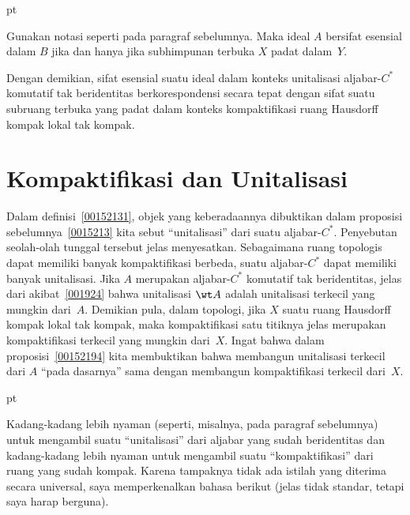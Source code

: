  pt

\begin{prop}\label{0038474} Gunakan notasi seperti pada paragraf sebelumnya. Maka
ideal $A$ bersifat esensial dalam $B$ jika dan hanya jika subhimpunan terbuka $X$ padat dalam~$Y$.
\end{prop}

Dengan demikian, sifat esensial suatu ideal dalam konteks unitalisasi aljabar-$C^*$
komutatif tak beridentitas berkorespondensi secara tepat dengan sifat suatu subruang terbuka
yang padat dalam konteks kompaktifikasi ruang Hausdorff kompak lokal
tak kompak.





















\section{Kompaktifikasi dan Unitalisasi}
Dalam definisi~\ref{00152131}, objek yang keberadaannya dibuktikan dalam
proposisi sebelumnya~\ref{0015213} kita sebut ``unitalisasi'' dari suatu aljabar-$C^*$. Penyebutan seolah-olah tunggal
tersebut jelas menyesatkan. Sebagaimana ruang topologis dapat memiliki banyak
kompaktifikasi berbeda, suatu aljabar-$C^*$ dapat memiliki banyak unitalisasi. Jika $A$ merupakan
aljabar-$C^*$ komutatif tak beridentitas, jelas dari akibat~\ref{001924} bahwa
unitalisasi $\wt A$ adalah unitalisasi terkecil yang mungkin dari~$A$. Demikian pula, dalam topologi,
jika $X$ suatu ruang Hausdorff kompak lokal tak kompak, maka kompaktifikasi
satu titiknya jelas merupakan kompaktifikasi terkecil yang mungkin dari~$X$. Ingat bahwa
dalam proposisi~\ref{00152194} kita membuktikan bahwa membangun unitalisasi terkecil
dari $A$ ``pada dasarnya'' sama dengan membangun kompaktifikasi terkecil
dari~$X$.

  pt

Kadang-kadang lebih nyaman (seperti, misalnya, pada paragraf sebelumnya) untuk mengambil suatu
``unitalisasi'' dari aljabar yang sudah beridentitas dan kadang-kadang lebih nyaman untuk mengambil suatu
``kompaktifikasi'' dari ruang yang sudah kompak. Karena tampaknya tidak ada
istilah yang diterima secara universal, saya memperkenalkan bahasa berikut (jelas tidak standar, tetapi
saya harap berguna).

